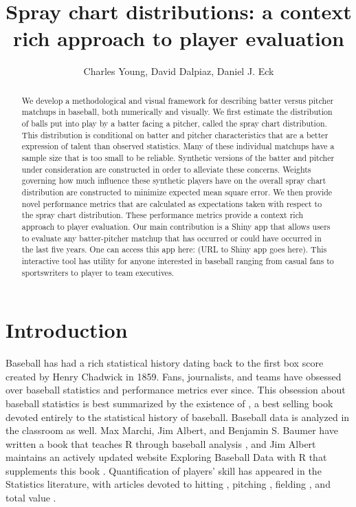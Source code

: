 \documentclass[11pt]{article}
\title{Spray chart distributions: a context rich approach to player evaluation}
\author{Charles Young, David Dalpiaz, Daniel J. Eck}
\begin{document}
\maketitle

\begin{abstract}
We develop a methodological and visual framework for describing batter versus pitcher matchups in baseball, both numerically and visually. We first estimate the distribution of balls put into play by a batter facing a pitcher, called the spray chart distribution. This distribution is conditional on batter and pitcher characteristics that are a better expression of talent than observed statistics. Many of these individual matchups have a sample size that is too small to be reliable. Synthetic versions of the batter and pitcher under consideration are constructed in order to alleviate these concerns. Weights governing how much influence these synthetic players have on the overall spray chart distribution are constructed to minimize expected mean square error. We then provide novel performance metrics that are calculated as expectations taken with respect to the spray chart distribution. These performance metrics provide a context rich approach to player evaluation. Our main contribution is a Shiny app \citep{shiny} that allows users to evaluate any batter-pitcher matchup that has occurred or could have occurred in the last five years. One can access this app here: (URL to Shiny app goes here). This interactive tool has utility for anyone interested in baseball ranging from casual fans to sportswriters to player to team executives.
\end{abstract}



\section{Introduction}

Baseball has had a rich statistical history dating back to the first box score created by Henry Chadwick in 1859. Fans, journalists, and teams have obsessed over baseball statistics and performance metrics ever since. This obsession about baseball statistics is best summarized by the existence of \cite{schwarz2004numbers}, a best selling book devoted entirely to the statistical history of baseball. Baseball data is analyzed in the classroom as well. Max Marchi, Jim Albert, and Benjamin S. Baumer have written a book that teaches R through baseball analysis \citep{marchi2019analyzing}, and Jim Albert maintains an actively updated website Exploring Baseball Data with R that supplements this book \citep{albert2020website}. 
Quantification of players' skill has appeared in the Statistics literature, with articles devoted to
hitting \citep{berry1999bridging, albert2008streaky, brown2008season, jensen2009hierarchical},
pitching \citep{albert2006pitching, shinya2017pitching},
fielding \citep{jensen2009bayesball, piette2012estimating}, 
and total value \citep{baumer2015openwar}.
\end{document}
